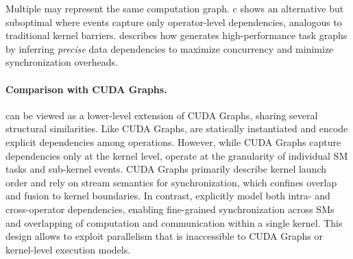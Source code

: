 Multiple \graphs may represent the same computation graph. c shows an alternative but suboptimal \graph where events capture only operator-level dependencies, analogous to traditional kernel barriers.  describes how \sys generates high-performance task graphs by inferring {\em precise} data dependencies to maximize concurrency and minimize synchronization overheads.




\paragraph{Comparison with CUDA Graphs.} 
\graphs can be viewed as a lower-level extension of CUDA Graphs, sharing several structural similarities. Like CUDA Graphs, \graphs are statically instantiated and encode explicit dependencies among operations. However, while CUDA Graphs capture dependencies only at the kernel level, \graphs operate at the granularity of individual SM tasks and sub-kernel events. CUDA Graphs primarily describe kernel launch order and rely on stream semantics for synchronization, which confines overlap and fusion to kernel boundaries. In contrast, \graphs explicitly model both intra- and cross-operator dependencies, enabling fine-grained synchronization across SMs and overlapping of computation and communication within a single kernel. This design allows \sys to exploit parallelism that is inaccessible to CUDA Graphs or kernel-level execution models.
